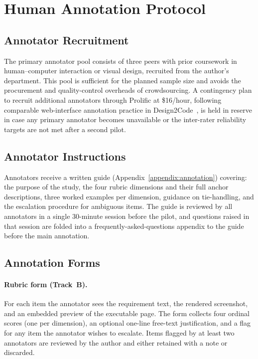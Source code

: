 \section{Human Annotation Protocol}
\label{sec:annotation-protocol}

\subsection{Annotator Recruitment}

The primary annotator pool consists of three peers with prior
coursework in human--computer interaction or visual design, recruited
from the author's department. This pool is sufficient for the planned
sample size and avoids the procurement and quality-control overheads of
crowdsourcing. A contingency plan to recruit additional annotators
through Prolific at \$16/hour, following comparable web-interface
annotation practice in Design2Code~\cite{design2code}, is held in
reserve in case any primary annotator becomes unavailable or the
inter-rater reliability targets are not met after a second pilot.

\subsection{Annotator Instructions}

Annotators receive a written guide (Appendix~\ref{appendix:annotation})
covering: the purpose of the study, the four rubric dimensions and
their full anchor descriptions, three worked examples per dimension,
guidance on tie-handling, and the escalation procedure for ambiguous
items. The guide is reviewed by all annotators in a single 30-minute
session before the pilot, and questions raised in that session are
folded into a frequently-asked-questions appendix to the guide before
the main annotation.

\subsection{Annotation Forms}

\paragraph{Rubric form (Track~B).}
For each item the annotator sees the requirement text, the rendered
screenshot, and an embedded preview of the executable page. The form
collects four ordinal scores (one per dimension), an optional one-line
free-text justification, and a flag for any item the annotator wishes
to escalate. Items flagged by at least two annotators are reviewed by
the author and either retained with a note or discarded.

